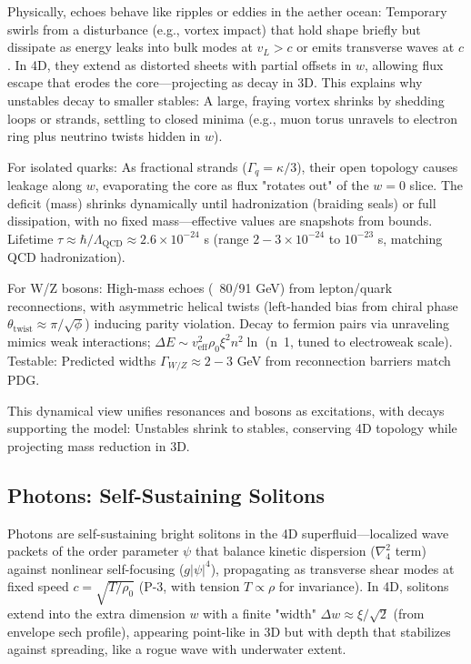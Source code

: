 \documentclass{article}
\begin{document}
Physically, echoes behave like ripples or eddies in the aether ocean: Temporary swirls from a disturbance (e.g., vortex impact) that hold shape briefly but dissipate as energy leaks into bulk modes at $v_L > c$ or emits transverse waves at $c$. In 4D, they extend as distorted sheets with partial offsets in $w$, allowing flux escape that erodes the core—projecting as decay in 3D. This explains why unstables decay to smaller stables: A large, fraying vortex shrinks by shedding loops or strands, settling to closed minima (e.g., muon torus unravels to electron ring plus neutrino twists hidden in $w$).

For isolated quarks: As fractional strands ($\Gamma_q = \kappa / 3$), their open topology causes leakage along $w$, evaporating the core as flux "rotates out" of the $w=0$ slice. The deficit (mass) shrinks dynamically until hadronization (braiding seals) or full dissipation, with no fixed mass—effective values are snapshots from bounds. Lifetime $\tau \approx \hbar / \Lambda_{\text{QCD}} \approx 2.6 \times 10^{-24}$ s (range $2-3 \times 10^{-24}$ to $10^{-23}$ s, matching QCD hadronization).

For W/Z bosons: High-mass echoes (~80/91 GeV) from lepton/quark reconnections, with asymmetric helical twists (left-handed bias from chiral phase $\theta_{\text{twist}} \approx \pi / \sqrt{\phi}$) inducing parity violation. Decay to fermion pairs via unraveling mimics weak interactions; $\Delta E \sim v_{\text{eff}}^2 \rho_0 \xi^2 n^2 \ln$ (n~1, tuned to electroweak scale). Testable: Predicted widths $\Gamma_{W/Z} \approx 2-3$ GeV from reconnection barriers match PDG.

This dynamical view unifies resonances and bosons as excitations, with decays supporting the model: Unstables shrink to stables, conserving 4D topology while projecting mass reduction in 3D.

\subsection{Photons: Self-Sustaining Solitons}

Photons are self-sustaining bright solitons in the 4D superfluid—localized wave packets of the order parameter $\psi$ that balance kinetic dispersion ($\nabla_4^2$ term) against nonlinear self-focusing ($g |\psi|^4$), propagating as transverse shear modes at fixed speed $c = \sqrt{T / \rho_0}$ (P-3, with tension $T \propto \rho$ for invariance). In 4D, solitons extend into the extra dimension $w$ with a finite "width" $\Delta w \approx \xi / \sqrt{2}$ (from envelope sech profile), appearing point-like in 3D but with depth that stabilizes against spreading, like a rogue wave with underwater extent.
\end{document}
